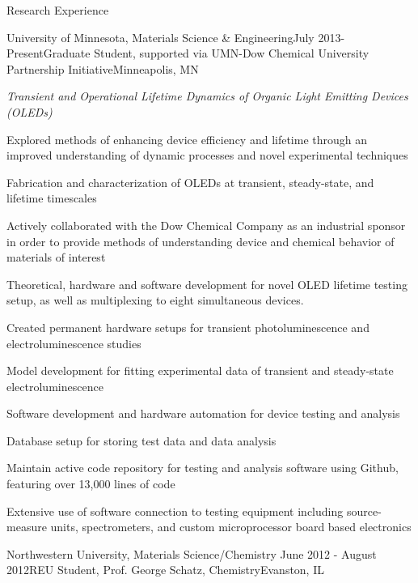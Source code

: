 \documentclass{resume} %
\begin{document}
\begin{rSection}{Research Experience}

\begin{rSubsection}{University of Minnesota, Materials Science \& Engineering}{July 2013-Present}{Graduate Student, supported via UMN-Dow Chemical University Partnership Initiative}{Minneapolis, MN}


\item {\em Transient and Operational Lifetime Dynamics of Organic Light Emitting Devices (OLEDs)}

\item Explored methods of enhancing device efficiency and lifetime through an improved understanding of dynamic processes and novel experimental techniques
\item Fabrication and characterization of OLEDs at transient, steady-state, and lifetime timescales
\item Actively collaborated with the Dow Chemical Company as an industrial sponsor in order to provide methods of understanding device and chemical behavior of materials of interest
\item Theoretical, hardware and software development for novel OLED lifetime testing setup, as well as multiplexing to eight simultaneous devices.
\item Created permanent hardware setups for transient photoluminescence and electroluminescence studies
\item Model development for fitting experimental data of transient and steady-state electroluminescence
\item Software development and hardware automation for device testing and analysis
\item Database setup for storing test data and data analysis
\item Maintain active code repository for testing and analysis software using Github, featuring over 13,000 lines of code
\item Extensive use of software connection to testing equipment including source-measure units, spectrometers, and custom microprocessor board based electronics
\end{rSubsection}


\begin{rSubsection}{Northwestern University, Materials Science/Chemistry }{June 2012 - August 2012}{REU Student, Prof. George Schatz, Chemistry}{Evanston, IL}


\end{rSubsection}
\end{rSection}
\end{document}

